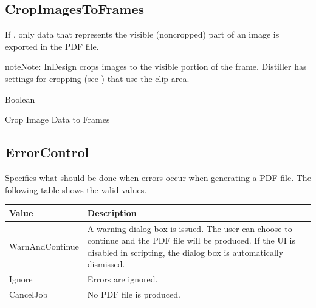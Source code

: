 \documentclass[letterpaper,12pt,english,openany,oneside]{sphinxmanual}
\begin{document}
\subsection{CropImagesToFrames}
\label{\detokenize{PDF_Create_NewNamespaces:cropimagestoframes}}
If  , only data that represents the visible (non\sphinxhyphen{}cropped) part of an image is exported in the PDF file.

\begin{sphinxadmonition}{note}{Note:}
InDesign crops images to the visible portion of the frame. Distiller has settings for cropping (see ) that use the clip area.
\end{sphinxadmonition}
\label{\detokenize{PDF_Create_NewNamespaces:type-28}}

Boolean

\label{\detokenize{PDF_Create_NewNamespaces:ui-name-28}}

Crop Image Data to Frames

\label{\detokenize{PDF_Create_NewNamespaces:default-value-27}}

\begin{sphinxVerbatim}[commandchars=\\\{\}]
\end{sphinxVerbatim}




\subsection{ErrorControl}
\label{\detokenize{PDF_Create_NewNamespaces:errorcontrol}}
Specifies what should be done when errors occur when generating a PDF file. The following table shows the valid values.


\begin{savenotes}\sphinxattablestart
\centering
{}\label{\detokenize{PDF_Create_NewNamespaces:section-4}}\nobreak
\begin{tabulary}{\linewidth}[t]{|T|T|}
\hline
\sphinxstyletheadfamily 
Value
&\sphinxstyletheadfamily 
Description
\\
\hline
WarnAndContinue
&
A warning dialog box is issued. The user can choose to continue and the PDF file will be produced. If the UI is disabled in scripting, the dialog box is automatically dismissed.
\\
\hline
Ignore
&
Errors are ignored.
\\
\hline
CancelJob
&
No PDF file is produced.
\\
\hline
\end{tabulary}
\par
\sphinxattableend\end{savenotes}
\label{\detokenize{PDF_Create_NewNamespaces:type-29}}
\end{document}
